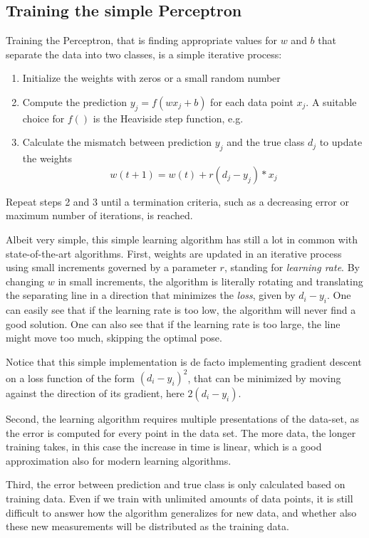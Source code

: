 \documentclass[paper=6.14in:9.21in,pagesize=pdftex,11pt,twoside,openright]{scrbook}
\begin{document}
\subsection{Training the simple Perceptron}
Training the Perceptron, that is finding appropriate values for $w$ and $b$ that separate the data into two classes, is a simple iterative process:

\begin{enumerate}
\item Initialize the weights with zeros or a small random number
\item Compute the prediction $y_j=f(wx_j+b)$ for each data point $x_j$. A suitable choice for $f()$ is the Heaviside step function, e.g.
\item Calculate the mismatch between prediction $y_j$ and the true class $d_j$ to update the weights
\begin{equation}
w(t+1)=w(t)+r(d_j-y_j)*x_j
\end{equation}
\end{enumerate}

Repeat steps 2 and 3 until a termination criteria, such as a decreasing error or maximum number of iterations, is reached.

Albeit very simple, this simple learning algorithm has still a lot in common with state-of-the-art algorithms. First, weights are updated in an iterative process using small increments governed by a parameter $r$, standing for \emph{learning rate}. By changing $w$ in small increments, the algorithm is literally rotating and translating the separating line in a direction that minimizes the \emph{loss}, given by $d_i-y_i$. One can easily see that if the learning rate is too low, the algorithm will never find a good solution. One can also see that if the learning rate is too large, the line might move too much, skipping the optimal pose. 

Notice that this simple implementation is de facto implementing gradient descent on a loss function of the form $(d_i-y_i)^2$, that can be minimized by moving against the direction of its gradient, here $2(d_i-y_i)$. 

Second, the learning algorithm requires multiple presentations of the data-set, as the error is computed for every point in the data set. The more data, the longer training takes, in this case the increase in time is linear, which is a good approximation also for modern learning algorithms. 

Third, the error between prediction and true class is only calculated based on training data. Even if we train with unlimited amounts of data points, it is still difficult to answer how the algorithm generalizes for new data, and whether also these new measurements will be distributed as the training data. 
\end{document}
